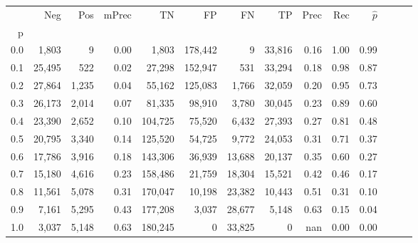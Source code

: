 \begin{tabular}{rrrrrrrrrrrrrr}
\toprule
{} &     Neg &    Pos & mPrec &       TN &       FP &      FN &      TP &  Prec &   Rec & $\hat{p}$ \\
p   &         &        &       &          &          &         &         &       &       &           \\
\midrule
0.0 &   1,803 &      9 &  0.00 &    1,803 &  178,442 &       9 &  33,816 &  0.16 &  1.00 &      0.99 \\
0.1 &  25,495 &    522 &  0.02 &   27,298 &  152,947 &     531 &  33,294 &  0.18 &  0.98 &      0.87 \\
0.2 &  27,864 &  1,235 &  0.04 &   55,162 &  125,083 &   1,766 &  32,059 &  0.20 &  0.95 &      0.73 \\
0.3 &  26,173 &  2,014 &  0.07 &   81,335 &   98,910 &   3,780 &  30,045 &  0.23 &  0.89 &      0.60 \\
0.4 &  23,390 &  2,652 &  0.10 &  104,725 &   75,520 &   6,432 &  27,393 &  0.27 &  0.81 &      0.48 \\
0.5 &  20,795 &  3,340 &  0.14 &  125,520 &   54,725 &   9,772 &  24,053 &  0.31 &  0.71 &      0.37 \\
0.6 &  17,786 &  3,916 &  0.18 &  143,306 &   36,939 &  13,688 &  20,137 &  0.35 &  0.60 &      0.27 \\
0.7 &  15,180 &  4,616 &  0.23 &  158,486 &   21,759 &  18,304 &  15,521 &  0.42 &  0.46 &      0.17 \\
0.8 &  11,561 &  5,078 &  0.31 &  170,047 &   10,198 &  23,382 &  10,443 &  0.51 &  0.31 &      0.10 \\
0.9 &   7,161 &  5,295 &  0.43 &  177,208 &    3,037 &  28,677 &   5,148 &  0.63 &  0.15 &      0.04 \\
1.0 &   3,037 &  5,148 &  0.63 &  180,245 &        0 &  33,825 &       0 &   nan &  0.00 &      0.00 \\
\bottomrule
\end{tabular}
